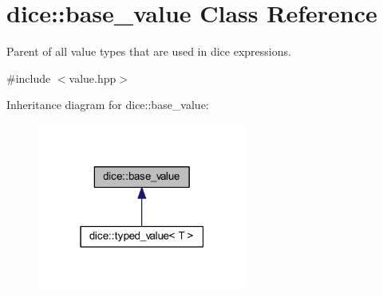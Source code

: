 \hypertarget{classdice_1_1base__value}{}\section{dice\+:\+:base\+\_\+value Class Reference}
\label{classdice_1_1base__value}


Parent of all value types that are used in dice expressions.  




{\ttfamily \#include $<$value.\+hpp$>$}



Inheritance diagram for dice\+:\+:base\+\_\+value\+:\nopagebreak
\begin{figure}[H]
\begin{center}
\leavevmode
\includegraphics[width=195pt]{classdice_1_1base__value__inherit__graph}
\end{center}
\end{figure}
